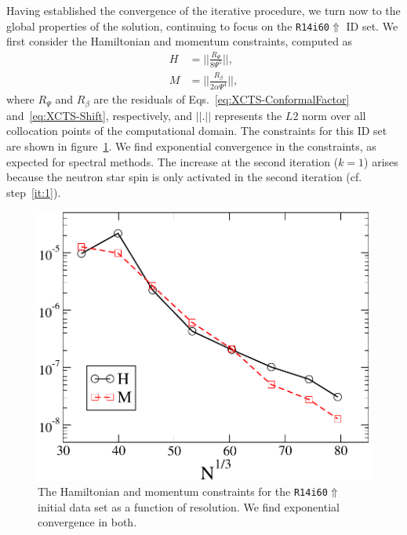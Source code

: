 Having established the convergence of the iterative procedure, we
turn now to the global
properties of the solution, continuing to focus on the {\tt R14i60$\Uparrow$} ID set. We first consider the Hamiltonian and momentum constraints, computed as
\begin{eqnarray}
H&=||\frac{R_{\Psi}}{8\Psi^5}||,\\
M &= ||\frac{R_{\beta}}{2\alpha\Psi^4}||,
\end{eqnarray}
where $R_{\Psi}$ and $R_{\beta}$ are the residuals of
Eqs.~\ref{eq:XCTS-ConformalFactor} and~\ref{eq:XCTS-Shift},
respectively, and $||.||$ represents the $L2$ norm over all
collocation points of the computational domain. The constraints for
this ID set are shown in figure~\ref{fig:HamMom}. We find exponential
convergence in the constraints, as expected for spectral methods. 
The increase at the second iteration ($k=1$) arises because the
neutron star spin is only activated in the second iteration 
(cf. step~\ref{it:1}).

\begin{figure}
\centerline{\includegraphics[scale=0.95]{chap4/HamMom}
}
\caption[Hamiltonian and momentum constraints of the {\tt R14i60$\Uparrow$} ID set]{\label{fig:HamMom} The Hamiltonian and momentum constraints for the {\tt R14i60$\Uparrow$} initial data set
as a function of resolution. We find exponential convergence in both.}
\end{figure}

